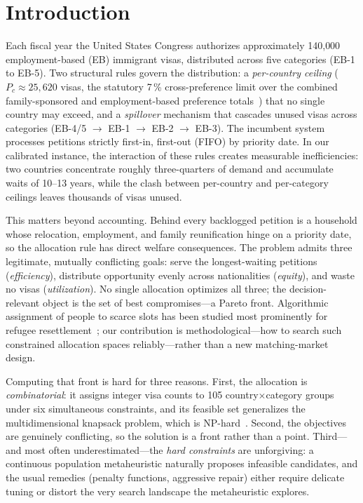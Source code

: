 \documentclass[runningheads]{llncs}
\begin{document}
\section{Introduction}
\label{sec:intro}

Each fiscal year the United States Congress authorizes approximately 140{,}000 employment-based (EB) immigrant visas, distributed across five categories (EB-1 to EB-5). Two structural rules govern the distribution: a \emph{per-country ceiling} ($P_c \approx 25{,}620$ visas, the statutory 7\,\% cross-preference limit over the combined family-sponsored and employment-based preference totals~\cite{uscis}) that no single country may exceed, and a \emph{spillover} mechanism that cascades unused visas across categories (EB-4/5 $\rightarrow$ EB-1 $\rightarrow$ EB-2 $\rightarrow$ EB-3). The incumbent system processes petitions strictly first-in, first-out (FIFO) by priority date. In our calibrated instance, the interaction of these rules creates measurable inefficiencies: two countries concentrate roughly three-quarters of demand and accumulate waits of 10--13 years, while the clash between per-country and per-category ceilings leaves thousands of visas unused.

This matters beyond accounting. Behind every backlogged petition is a household whose relocation, employment, and family reunification hinge on a priority date, so the allocation rule has direct welfare consequences. The problem admits three legitimate, mutually conflicting goals: serve the longest-waiting petitions (\emph{efficiency}), distribute opportunity evenly across nationalities (\emph{equity}), and waste no visas (\emph{utilization}). No single allocation optimizes all three; the decision-relevant object is the set of best compromises---a Pareto front. Algorithmic assignment of people to scarce slots has been studied most prominently for refugee resettlement~\cite{bansak}; our contribution is methodological---how to search such constrained allocation spaces reliably---rather than a new matching-market design.

Computing that front is hard for three reasons. First, the allocation is \emph{combinatorial}: it assigns integer visa counts to 105 country$\times$category groups under six simultaneous constraints, and its feasible set generalizes the multidimensional knapsack problem, which is NP-hard~\cite{garey}. Second, the objectives are genuinely conflicting, so the solution is a front rather than a point. Third---and most often underestimated---the \emph{hard constraints} are unforgiving: a continuous population metaheuristic naturally proposes infeasible candidates, and the usual remedies (penalty functions, aggressive repair) either require delicate tuning or distort the very search landscape the metaheuristic explores.
\end{document}
